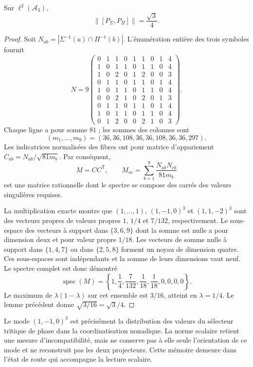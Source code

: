 \begin{proposition}
Sur \(\ell^2(\mathcal A_3)\),
\begin{equation}
 \|[P_\Sigma,P_\Pi]\|=\frac{\sqrt3}{4}.
 \label{ivloc:norma}
\end{equation}
\end{proposition}
\begin{proof}
Soit \(N_{ab}=|\Sigma^{-1}(a)\cap\Pi^{-1}(b)|\). L'énumération entière
des trois symboles fournit
\[
 N=9\begin{pmatrix}
 0&1&1&0&1&1&0&1&4\\
 1&0&1&1&0&1&1&0&4\\
 1&0&2&0&1&2&0&0&3\\
 0&1&1&0&1&1&0&1&4\\
 1&0&1&1&0&1&1&0&4\\
 0&0&2&1&0&2&0&1&3\\
 0&1&1&0&1&1&0&1&4\\
 1&0&1&1&0&1&1&0&4\\
 0&1&2&0&0&2&1&0&3
 \end{pmatrix}.
\]
Chaque ligne a pour somme \(81\) ; les sommes des colonnes sont
\[
 (m_1,\ldots,m_9)=(36,36,108,36,36,108,36,36,297).
\]
Les indicatrices normalisées des fibres ont pour matrice
d'appariement \(C_{ab}=N_{ab}/\sqrt{81m_b}\). Par conséquent,
\[
 M=CC^{\mathsf T},\qquad
 M_{ac}=\sum_{b=1}^9\frac{N_{ab}N_{cb}}{81m_b}
\]
est une matrice rationnelle dont le spectre se compose des carrés des
valeurs singulières requises.

La multiplication exacte montre que \((1,\ldots,1)\),
\((1,-1,0)^3\) et \((1,1,-2)^3\) sont des vecteurs propres de valeurs propres
\(1\), \(1/4\) et \(7/132\), respectivement. Le sous-espace des
vecteurs à support dans \(\{3,6,9\}\) dont la somme est nulle a pour dimension
deux et pour valeur propre \(1/18\). Les vecteurs de somme nulle à support dans
\(\{1,4,7\}\) ou dans \(\{2,5,8\}\) forment un noyau de dimension
quatre. Ces sous-espaces sont indépendants et la somme de leurs dimensions vaut
neuf. Le spectre complet est donc démontré
\[
 \operatorname{spec}(M)=
 \left\{1,\frac14,\frac7{132},\frac1{18},\frac1{18},0,0,0,0\right\}.
\]
Le maximum de \(\lambda(1-\lambda)\) sur cet ensemble est \(3/16\), atteint en \(\lambda=1/4\). Le lemme précédent donne \(\sqrt{3/16}=\sqrt3/4\).
\end{proof}

Le mode \((1,-1,0)^3\) est précisément la distribution des valeurs du
sélecteur tritique de phase dans la coordinatisation nonadique. La norme scalaire retient
une mesure d'incompatibilité, mais ne conserve pas à elle seule
l'orientation de ce mode et ne reconstruit pas les deux projecteurs. Cette mémoire
demeure dans l'état de route qui accompagne la lecture scalaire.


